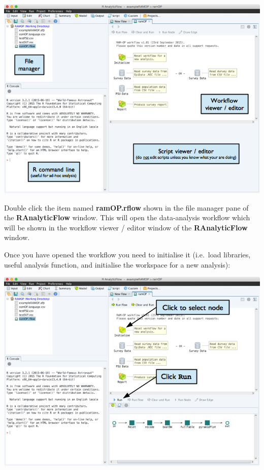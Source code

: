 \documentclass[12pt,a4paper]{book}
\theoremstyle{definition}
\theoremstyle{definition}
\theoremstyle{definition}
\theoremstyle{remark}
\begin{document}
\begin{center}\includegraphics[width=9.76in]{figures/openWorkflowRAF} \end{center}

Double click the item named \textbf{ramOP.rflow} shown in the file
manager pane of the \textbf{RAnalyticFlow} window. This will open the
data-analysis workflow which will be shown in the workflow viewer /
editor window of the \textbf{RAnalyticFlow} window.

Once you have opened the workflow you need to initialise it (i.e.~load
libraries, useful analysis function, and initialise the workspace for a
new analysis):

\newpage

\begin{center}\includegraphics[width=9.76in]{figures/runWorkflowRAF} \end{center}
\end{document}
